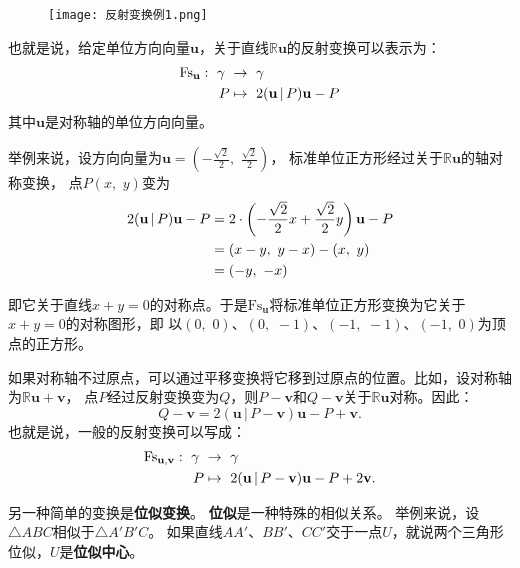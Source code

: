 \documentclass[12pt,UTF8]{ctexbook}
\begin{document}
\begin{figure} %
    \vspace{-40pt}
    \flushright
    \texttt{[image: 反射变换例1.png]}
\end{figure}

也就是说，给定单位方向向量$\mathbf{u}$，关于直线$\mathbb{R}\mathbf{u}$的反射变换可以表示为：
\begin{align}
    \mathrm{Fs}_\mathbf{u} : \,\, \gamma\,\,&\rightarrow \,\, \gamma \notag \\
    P &\mapsto \,\, 2(\mathbf{u}\,|\,P)\mathbf{u} - P \notag
\end{align}
其中$\mathbf{u}$是对称轴的单位方向向量。

\vspace{1.5em}

举例来说，设方向向量为$\mathbf{u} = \left(-\frac{\sqrt{2}}{2},\,\,\frac{\sqrt{2}}{2}\right)$，
标准单位正方形经过关于$\mathbb{R}\mathbf{u}$的轴对称变换，
点$P(x,\,\,y)$变为
\begin{align}
    2(\mathbf{u}\,|\,P)\mathbf{u} - P &= 2\cdot \left(-\frac{\sqrt{2}}{2}x + \frac{\sqrt{2}}{2}y \right)\mathbf{u} - P \notag \\
    &= (x - y,\,\, y - x) - (x,\,\, y) \notag \\
    &= (-y, \,\, -x) \notag
\end{align}

即它关于直线$x+y=0$的对称点。于是$\mathrm{Fs}_\mathbf{u}$将标准单位正方形变换为它关于$x+y=0$的对称图形，即
以$(0,\,\,0)$、$(0,\,\,-1)$、$(-1,\,\,-1)$、$(-1,\,\,0)$为顶点的正方形。

如果对称轴不过原点，可以通过平移变换将它移到过原点的位置。比如，设对称轴为$\mathbb{R}\mathbf{u} + \mathbf{v}$，
点$P$经过反射变换变为$Q$，则$P - \mathbf{v}$和$Q - \mathbf{v}$关于$\mathbb{R}\mathbf{u}$对称。因此：
$$ Q - \mathbf{v} = 2(\mathbf{u}\,|\,P - \mathbf{v})\mathbf{u} - P + \mathbf{v}. $$
也就是说，一般的反射变换可以写成：
\begin{align}
    \mathrm{Fs}_{\mathbf{u}, \mathbf{v}} : \,\, \gamma\,\,&\rightarrow \,\, \gamma \notag \\
    P &\mapsto \,\, 2(\mathbf{u}\,|\,P - \mathbf{v})\mathbf{u} - P + 2\mathbf{v}. \notag
\end{align}

另一种简单的变换是\textbf{位似变换}。
\textbf{位似}是一种特殊的相似关系。
举例来说，设$\triangle ABC$相似于$\triangle A'B'C$。
如果直线$AA'$、$BB'$、$CC'$交于一点$U$，就说两个三角形位似，$U$是\textbf{位似中心}。
\end{document}
